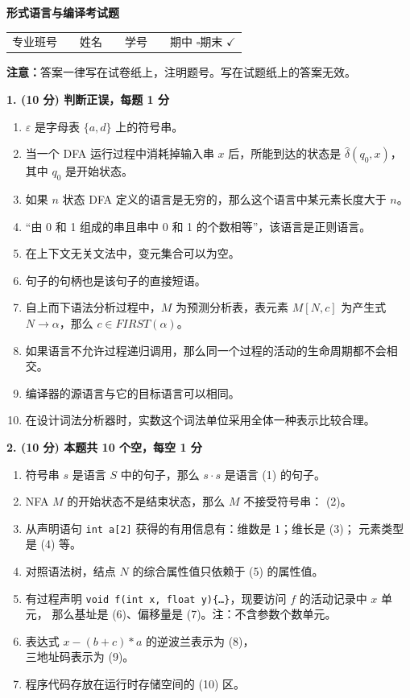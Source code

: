 \documentclass[UTF8,zihao=-4]{ctexart}
\newcommand{\blank}[1][3cm]{\underline{\makebox[#1]{}}}
\newcommand{\score}[1]{\textbf{(#1 分)}}
\newcommand{\eps}{\varepsilon}
\newcommand{\gto}{\rightarrow}
\newcommand{\qtitle}[3]{\vspace{0.6em}\textbf{#1. \score{#2} #3}\par}
\newcommand{\kw}[1]{\texttt{#1}}
\begin{document}
\begin{center}
  {\Large\bfseries 形式语言与编译考试题}
\end{center}

\vspace{0.5em}
\begin{tabularx}{\textwidth}{@{}lXlXlXl@{}}
专业班号 & \hrulefill & 姓名 & \hrulefill & 学号 & \hrulefill &
期中 $\square$\quad 期末 $\checkmark$
\end{tabularx}

\textbf{注意：}答案一律写在试卷纸上，注明题号。写在试题纸上的答案无效。

\qtitle{1}{10}{判断正误，每题 1 分}
\begin{enumerate}[label=(\arabic*)]
  \item $\eps$ 是字母表 $\{a,d\}$ 上的符号串。
  \item 当一个 DFA 运行过程中消耗掉输入串 $x$ 后，所能到达的状态是
    $\hat{\delta}(q_0,x)$，其中 $q_0$ 是开始状态。
  \item 如果 $n$ 状态 DFA 定义的语言是无穷的，那么这个语言中某元素长度大于 $n$。
  \item ``由 0 和 1 组成的串且串中 0 和 1 的个数相等''，该语言是正则语言。
  \item 在上下文无关文法中，变元集合可以为空。
  \item 句子的句柄也是该句子的直接短语。
  \item 自上而下语法分析过程中，$M$ 为预测分析表，表元素
    $M[N,c]$ 为产生式 $N\gto\alpha$，那么 $c\in FIRST(\alpha)$。
  \item 如果语言不允许过程递归调用，那么同一个过程的活动的生命周期都不会相交。
  \item 编译器的源语言与它的目标语言可以相同。
  \item 在设计词法分析器时，实数这个词法单位采用全体一种表示比较合理。
\end{enumerate}

\qtitle{2}{10}{本题共 10 个空，每空 1 分}
\begin{enumerate}[label=$\diamond$,leftmargin=2em]
  \item 符号串 $s$ 是语言 $S$ 中的句子，那么 $s\cdot s$ 是语言 \blank[3cm] (1)  的句子。
  \item NFA $M$ 的开始状态不是结束状态，那么 $M$ 不接受符号串：\blank[3cm] (2)。
  \item 从声明语句 \kw{int a[2]} 获得的有用信息有：维数是 1；维长是 \blank[2.2cm] (3)；
    元素类型是 \blank[2.2cm] (4) 等。
  \item 对照语法树，结点 $N$ 的综合属性值只依赖于 \blank[3cm] (5) 的属性值。
  \item 有过程声明 \kw{void f(int x, float y)\{\ldots\}}，现要访问 $f$ 的活动记录中 $x$ 单元，
    那么基址是 \blank[2.6cm] (6)、偏移量是 \blank[2.6cm] (7)。注：不含参数个数单元。
  \item 表达式 $x-(b+c)*a$ 的逆波兰表示为 \blank[4.2cm] (8)，\\
    三地址码表示为 \blank[6cm] (9)。
  \item 程序代码存放在运行时存储空间的 \blank[3cm] (10) 区。
\end{enumerate}
\end{document}
